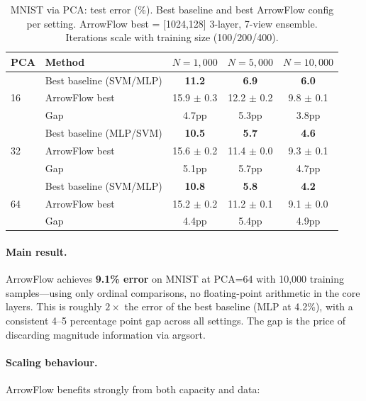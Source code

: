 \documentclass[12pt]{article}
\begin{document}
\begin{table}[ht]
\centering
\caption{MNIST via PCA: test error (\%). Best baseline and best ArrowFlow config per setting. ArrowFlow best = [1024,128] 3-layer, 7-view ensemble. Iterations scale with training size (100/200/400).}
\label{tab:mnist-pca}
\small
\begin{tabular}{ll ccc}
\toprule
PCA & Method & $N{=}1{,}000$ & $N{=}5{,}000$ & $N{=}10{,}000$ \\
\midrule
\multirow{3}{*}{16}
  & Best baseline (SVM/MLP) & \textbf{11.2} & \textbf{6.9} & \textbf{6.0} \\
  & ArrowFlow best          & 15.9 $\pm$ 0.3 & 12.2 $\pm$ 0.2 & 9.8 $\pm$ 0.1 \\
  & Gap                     & 4.7pp & 5.3pp & 3.8pp \\
\midrule
\multirow{3}{*}{32}
  & Best baseline (MLP/SVM) & \textbf{10.5} & \textbf{5.7} & \textbf{4.6} \\
  & ArrowFlow best          & 15.6 $\pm$ 0.2 & 11.4 $\pm$ 0.0 & 9.3 $\pm$ 0.1 \\
  & Gap                     & 5.1pp & 5.7pp & 4.7pp \\
\midrule
\multirow{3}{*}{64}
  & Best baseline (SVM/MLP) & \textbf{10.8} & \textbf{5.8} & \textbf{4.2} \\
  & ArrowFlow best          & 15.2 $\pm$ 0.2 & 11.2 $\pm$ 0.1 & 9.1 $\pm$ 0.0 \\
  & Gap                     & 4.4pp & 5.4pp & 4.9pp \\
\bottomrule
\end{tabular}
\end{table}

\paragraph{Main result.} ArrowFlow achieves \textbf{9.1\% error} on MNIST at PCA=64 with 10{,}000 training samples---using only ordinal comparisons, no floating-point arithmetic in the core layers. This is roughly $2\times$ the error of the best baseline (MLP at 4.2\%), with a consistent 4--5 percentage point gap across all settings. The gap is the price of discarding magnitude information via argsort.

\paragraph{Scaling behaviour.} ArrowFlow benefits strongly from both capacity and data:
\end{document}
